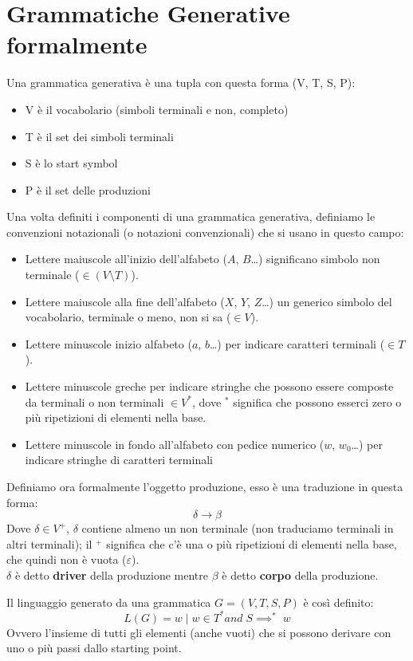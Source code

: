 \documentclass[class=book, crop=false, oneside, 12pt]{standalone}
\begin{document}
\section{Grammatiche Generative formalmente}
Una grammatica generativa è una tupla con questa forma (V, T, S, P):
\begin{itemize}
    \item V è il vocabolario (simboli terminali e non, completo)
    \item T è il set dei simboli terminali
    \item S è lo start symbol
    \item P è il set delle produzioni
\end{itemize}
Una volta definiti i componenti di una grammatica generativa, definiamo le convenzioni notazionali (o notazioni convenzionali) che si usano in questo campo:
\begin{itemize}
    \item Lettere maiuscole all’inizio dell’alfabeto ($A$, $B$…) significano simbolo non terminale ($\in (V \setminus T)$).
    \item Lettere maiuscole alla fine dell’alfabeto ($X$, $Y$, $Z$…) un generico simbolo del vocabolario, terminale o meno, non si sa ($\in V$).
    \item Lettere minuscole inizio alfabeto ($a$, $b$…) per indicare caratteri terminali ($\in T$).
    \item Lettere minuscole greche per indicare stringhe che possono essere composte da terminali o non terminali $\in V^*$, dove $^*$ significa che possono esserci zero o più ripetizioni di elementi nella base.
    \item Lettere minuscole in fondo all’alfabeto con pedice numerico ($w$, $w_0$…) per indicare stringhe di caratteri terminali
\end{itemize}
Definiamo ora formalmente l'oggetto produzione, esso è una traduzione in questa forma:
\begin{equation}
    \delta \to \beta
\end{equation}
Dove $\delta \in V^+$, $\delta$ contiene almeno un non terminale (non traduciamo terminali in altri terminali); il $^+$ significa che c’è una o più ripetizioni di elementi nella base, che quindi non è vuota ($\varepsilon$).\\
$\delta$ è detto \textbf{driver} della produzione mentre $\beta$ è detto \textbf{corpo} della produzione.

Il linguaggio generato da una grammatica $G = (V,T,S,P)$ è così definito:
\begin{equation}
    L(G) = {w \mid w \in T^* and \; S \implies^* \; w }
\end{equation}
Ovvero l'insieme di tutti gli elementi (anche vuoti) che si possono derivare con uno o più passi dallo starting point.
\end{document}
